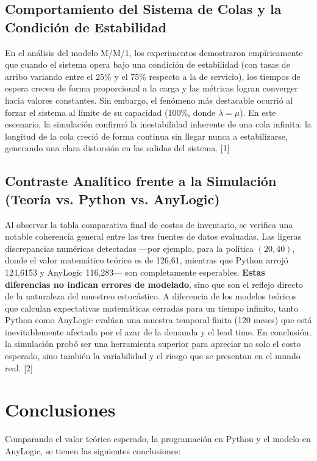 \documentclass{article}
\begin{document}
\subsection{Comportamiento del Sistema de Colas y la Condición de Estabilidad}
En el análisis del modelo M/M/1, los experimentos demostraron empíricamente que cuando el sistema opera bajo una condición de estabilidad (con tasas de arribo variando entre el 25\% y el 75\% respecto a la de servicio), los tiempos de espera crecen de forma proporcional a la carga y las métricas logran converger hacia valores constantes. Sin embargo, el fenómeno más destacable ocurrió al forzar el sistema al límite de su capacidad (100\%, donde $\lambda = \mu$). En este escenario, la simulación confirmó la inestabilidad inherente de una cola infinita: la longitud de la cola creció de forma continua sin llegar nunca a estabilizarse, generando una clara distorsión en las salidas del sistema. [1]

\subsection{Contraste Analítico frente a la Simulación (Teoría vs. Python vs. AnyLogic)}
Al observar la tabla comparativa final de costos de inventario, se verifica una notable coherencia general entre las tres fuentes de datos evaluadas. Las ligeras discrepancias numéricas detectadas —por ejemplo, para la política $(20, 40)$, donde el valor matemático teórico es de 126,61, mientras que Python arrojó 124,6153 y AnyLogic 116,283— son completamente esperables. \textbf{Estas diferencias no indican errores de modelado}, sino que son el reflejo directo de la naturaleza del muestreo estocástico. A diferencia de los modelos teóricos que calculan expectativas matemáticas cerradas para un tiempo infinito, tanto Python como AnyLogic evalúan una muestra temporal finita (120 meses) que está inevitablemente afectada por el azar de la demanda y el lead time. En conclusión, la simulación probó ser una herramienta superior para apreciar no solo el costo esperado, sino también la variabilidad y el riesgo que se presentan en el mundo real. [2]


\section{Conclusiones}
\label{sec:conclusiones}


Comparando el valor teórico esperado, la programación en Python y el modelo en AnyLogic, se tienen las siguientes conclusiones:
\end{document}
